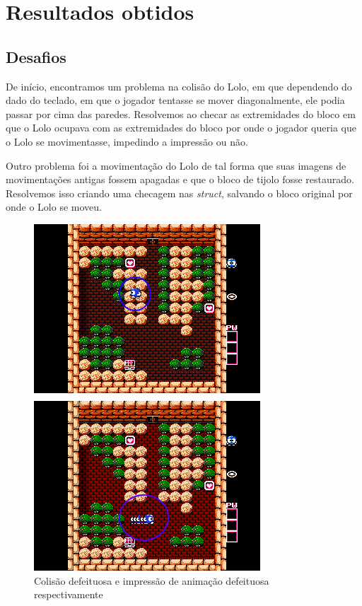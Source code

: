 \documentclass[10pt, conference, compsocconf]{IEEEtran}
\begin{document}
\section{Resultados obtidos}
\label{sec:Resultados}

\subsection{Desafios}{
De início, encontramos um problema na colisão do
Lolo, em que dependendo do dado do teclado, em que
o jogador tentasse se mover diagonalmente, ele podia
passar por cima das paredes. Resolvemos ao checar
as extremidades do bloco em que o Lolo ocupava com
as extremidades do bloco por onde o jogador queria
que o Lolo se movimentasse, impedindo a impressão
ou não.

Outro problema foi a movimentação do Lolo de tal forma que suas imagens de
movimentações antigas fossem apagadas e que o bloco de tijolo fosse restaurado.
Resolvemos isso criando uma checagem nas \textit{struct}, salvando o bloco original por
onde o Lolo se moveu. }

\begin{figure}[htb]
  \begin{center}
   \includegraphics[width=0.9\linewidth]{./Figures/image_newest.png}
  \end{center}
  \caption{Colisão defeituosa e impressão
de animação defeituosa respectivamente}
\end{figure}
\end{document}
